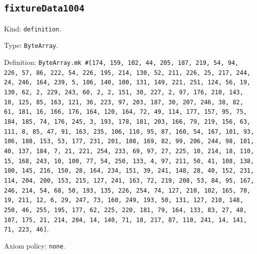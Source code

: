 \documentclass[11pt]{article}
\begin{document}
\subsection*{\texttt{fixtureData1004}}
\noindent Kind: \texttt{definition}.\par
\noindent Type: \texttt{ByteArray}.\par
\noindent Definition: \texttt{ByteArray.mk \#[174, 159, 102, 44, 205, 187, 219, 54, 94, 226, 57, 86, 222, 54, 226, 195, 214, 130, 52, 211, 226, 25, 217, 244, 24, 246, 164, 239, 5, 106, 140, 100, 131, 149, 221, 251, 124, 56, 19, 130, 62, 2, 229, 243, 60, 2, 2, 151, 30, 227, 2, 97, 176, 210, 143, 10, 125, 85, 163, 121, 36, 223, 97, 203, 187, 30, 207, 246, 38, 82, 61, 181, 16, 166, 176, 164, 120, 164, 72, 49, 114, 177, 157, 95, 75, 184, 185, 74, 176, 245, 3, 193, 178, 181, 203, 166, 79, 219, 156, 63, 111, 8, 85, 47, 91, 163, 235, 106, 110, 95, 87, 160, 54, 167, 101, 93, 106, 188, 153, 53, 177, 231, 201, 108, 169, 82, 99, 206, 244, 98, 101, 40, 137, 184, 7, 21, 221, 254, 233, 69, 97, 27, 225, 10, 214, 18, 110, 15, 168, 243, 10, 100, 77, 54, 250, 133, 4, 97, 211, 50, 41, 108, 138, 100, 145, 216, 150, 28, 164, 234, 151, 39, 241, 148, 28, 40, 152, 231, 114, 204, 200, 153, 215, 127, 241, 163, 72, 219, 208, 53, 84, 95, 167, 246, 214, 54, 68, 50, 193, 135, 226, 254, 74, 127, 210, 102, 165, 70, 19, 211, 12, 6, 29, 247, 73, 160, 249, 193, 50, 131, 127, 210, 148, 250, 46, 255, 195, 177, 62, 225, 220, 181, 79, 164, 133, 83, 27, 48, 107, 175, 21, 214, 204, 14, 140, 71, 18, 217, 87, 110, 241, 14, 141, 71, 223, 46]}.\par
\noindent Axiom policy: \texttt{none}.\par
\end{document}

